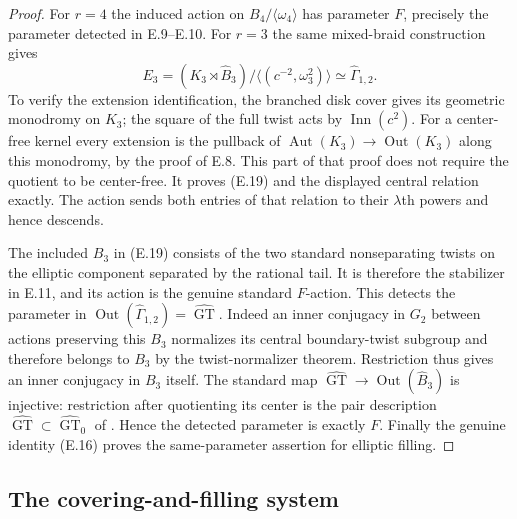 \begin{proof}
For $r=4$ the induced action on
$B_4/\langle\omega _4\rangle$ has parameter $F$, precisely
the parameter detected in E.9--E.10.  For $r=3$ the same
mixed-braid construction gives
\[
 E_3=(K_3\rtimes\widehat B_3)/
       \langle(c^{-2},\omega _3^2)\rangle
       \simeq\widehat\Gamma_{1,2}.                       \tag{E.19}
\]
To verify the extension identification, the branched disk cover
gives its geometric monodromy on $K_3$; the square of the
full twist acts by $\operatorname{Inn}(c^2)$.  For a
center-free kernel every extension is the pullback of
$\operatorname{Aut}(K_3)\to\operatorname{Out}(K_3)$ along
this monodromy, by the proof of E.8.  This part of that proof
does not require the quotient to be center-free.
It proves (E.19) and the displayed central relation exactly.
The action sends both entries of that relation to their
$\lambda$th powers and hence descends.

The included $B_3$ in (E.19) consists of the two standard
nonseparating twists on the elliptic component separated by
the rational tail.  It is therefore the stabilizer in E.11,
and its action is the genuine standard $F$-action.  This
detects the parameter in
$\operatorname{Out}(\widehat\Gamma_{1,2})=
\widehat{\operatorname{GT}}$.
Indeed an inner conjugacy in $G_2$ between actions preserving
this $B_3$ normalizes its central boundary-twist subgroup and
therefore belongs to $B_3$ by the twist-normalizer theorem.
Restriction thus gives an inner conjugacy in $B_3$ itself.
The standard map
$\widehat{\operatorname{GT}}\to\operatorname{Out}(\widehat B_3)$
is injective: restriction after quotienting its center is the
pair description
$\widehat{\operatorname{GT}}\subset
\widehat{\operatorname{GT}}_0$ of
\cite[\S0.3 and Main Theorem (a)]{ET_HS2000}.
Hence the detected parameter is exactly $F$.
Finally the genuine identity (E.16) proves the same-parameter
assertion for elliptic filling.
\end{proof}

\subsection{The covering-and-filling system}

